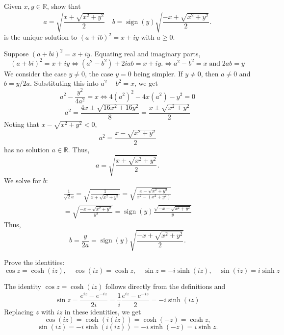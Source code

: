 \documentclass[12pt, answers]{exam}
\newcommand{\RR}{\mathbb{R}}
\DeclareMathOperator{\sign}{sign}
\begin{document}
\begin{questions}
    \question\label{Q:sqrt}
    Given $x,y\in\RR$, show that 
    \begin{equation*}
        a=\sqrt{\frac{x+\sqrt{x^2+y^2}}2}\quad
        b=\sign(y)\sqrt{\frac{-x+\sqrt{x^2+y^2}}2}.
    \end{equation*}
    is the unique solution to $(a+ib)^2=x+iy$ with $a\geq 0$.
    \begin{solution}
        Suppose $(a+bi)^2 = x+iy$. Equating real and imaginary parts,
        \[
            (a+bi)^2 = x+iy\Longleftrightarrow (a^2-b^2) + 2iab = x + iy.
            \Longleftrightarrow a^2-b^2=x\;\text{and}\;2ab=y
        \]
        We consider the case $y\neq 0$, the case $y=0$ being simpler. If $y\neq 0$, then $a\neq 0$ and $b=y/2a$. Substituting this into $a^2-b^2=x$, we get
        \[
            a^2 - \frac{y^2}{4a^2} = x\Longleftrightarrow 4(a^2)^2 - 4x(a^2) - y^2=0
        \]
        \[
            a^2 = \frac{4x\pm \sqrt{16x^2 + 16y^2}}{8} = \frac{x\pm \sqrt{x^2 + y^2}}{2}
        \]
        Noting that $x-\sqrt{x^2+y^2}<0$,
        \[
            a^2=\frac{x-\sqrt{x^2+y^2}}2
        \]
        has no solution $a\in\RR$. Thus,
        \[
            a = \sqrt{\frac{x+\sqrt{x^2+y^2}}2}.
        \]
        We solve for $b$:
        \begin{multline*}
            \frac1{\sqrt2a} = \sqrt{\frac1{x+\sqrt{x^2+y^2}}} = \sqrt{\frac{x - \sqrt{x^2+y^2}}{x^2 - (x^2+y^2)}}\\ = \sqrt{\frac{-x+\sqrt{x^2+y^2}}{y^2}}
            =\sign(y)\frac{\sqrt{-x+\sqrt{x^2+y^2}}}{y}
        \end{multline*}
        Thus,
        \[
    b = \frac{y}{2a} = \sign(y)\sqrt{\frac{-x+\sqrt{x^2+y^2}}{2}}.
        \]
    \end{solution}



    \question Prove the identities:
    \[
        \cos z = \cosh(iz),\quad \cos(iz) = \cosh z,\quad
        \sin z = -i\sinh(iz),\quad \sin(iz) = i\sinh z
    \]
    \begin{solution}
        The identity $\cos z=\cosh(iz)$ follows directly from the definitions and
        \[
            \sin z = \frac{e^{iz} - e^{-iz}}{2i} = \frac1i\frac{e^{iz} - e^{-iz}}{2} = -i\sinh(iz)
        \]
        Replacing $z$ with $iz$ in these identities, we get
        \[
            \cos(iz) = \cosh(i(iz)) = \cosh(-z) = \cosh z,
        \]
        \[
            \sin(iz) = -i\sinh(i(iz)) = -i\sinh(-z) = i\sinh z.
        \]
    \end{solution}




\end{questions}
\end{document}
